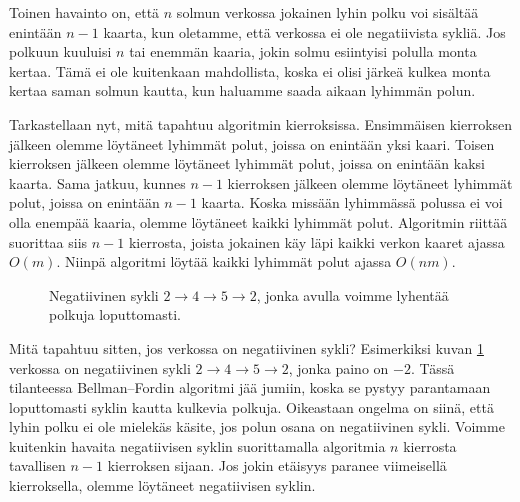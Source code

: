 Toinen havainto on,
että $n$ solmun verkossa jokainen lyhin polku voi
sisältää enintään $n-1$ kaarta,
kun oletamme, että verkossa ei ole negatiivista sykliä.
Jos polkuun kuuluisi $n$ tai enemmän kaaria,
jokin solmu esiintyisi polulla monta kertaa.
Tämä ei ole kuitenkaan mahdollista,
koska ei olisi järkeä kulkea monta kertaa saman solmun kautta,
kun haluamme saada aikaan lyhimmän polun.

Tarkastellaan nyt, mitä tapahtuu algoritmin kierroksissa.
Ensimmäisen kierroksen jälkeen olemme löytäneet lyhimmät polut,
joissa on enintään yksi kaari.
Toisen kierroksen jälkeen olemme löytäneet lyhimmät polut,
joissa on enintään kaksi kaarta.
Sama jatkuu, kunnes $n-1$ kierroksen jälkeen olemme löytäneet
lyhimmät polut, joissa on enintään $n-1$ kaarta.
Koska missään lyhimmässä polussa ei voi olla enempää kaaria,
olemme löytäneet kaikki lyhimmät polut.
Algoritmin riittää suorittaa siis $n-1$ kierrosta,
joista jokainen käy läpi kaikki verkon kaaret ajassa $O(m)$.
Niinpä algoritmi löytää kaikki lyhimmät polut ajassa $O(nm)$.

\begin{figure}
\center
\begin{center}
\end{center}
\caption{Negatiivinen sykli $2 \rightarrow 4 \rightarrow 5 \rightarrow 2$,
jonka avulla voimme lyhentää polkuja loputtomasti.}
\label{fig:belsyk}
\end{figure}

Mitä tapahtuu sitten, jos verkossa on negatiivinen sykli?
Esimerkiksi kuvan \ref{fig:belsyk} verkossa on negatiivinen sykli
$2 \rightarrow 4 \rightarrow 5 \rightarrow 2$, jonka paino on $-2$.
Tässä tilanteessa Bellman–Fordin algoritmi jää jumiin, koska se pystyy parantamaan
loputtomasti syklin kautta kulkevia polkuja.
Oikeastaan ongelma on siinä, että lyhin polku ei ole mielekäs käsite,
jos polun osana on negatiivinen sykli.
Voimme kuitenkin havaita negatiivisen syklin suorittamalla
algoritmia $n$ kierrosta tavallisen $n-1$ kierroksen sijaan.
Jos jokin etäisyys paranee viimeisellä kierroksella,
olemme löytäneet negatiivisen syklin.

